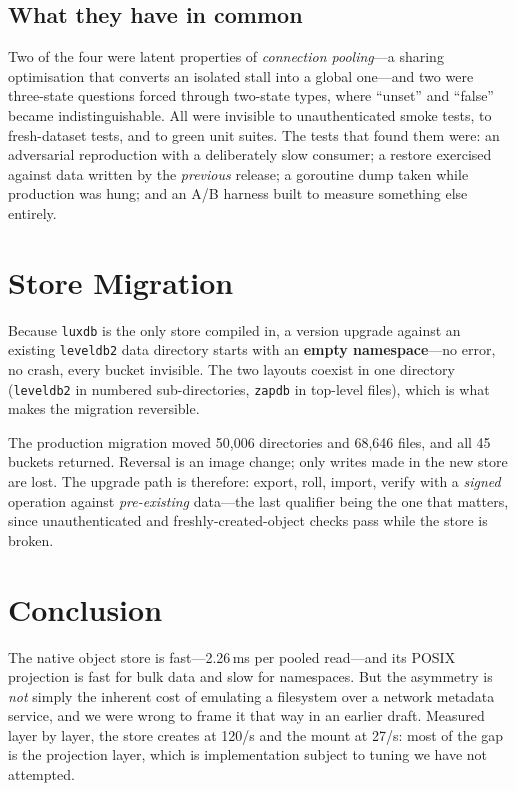 \documentclass[11pt]{article}
\begin{document}
\subsection{What they have in common}
\label{sec:defects-common}

Two of the four were latent properties of \emph{connection pooling}---a
sharing optimisation that converts an isolated stall into a global one---and
two were three-state questions forced through two-state types, where
``unset'' and ``false'' became indistinguishable. All were invisible to
unauthenticated smoke tests, to fresh-dataset tests, and to green unit suites.
The tests that found them were: an adversarial reproduction with a
deliberately slow consumer; a restore exercised against data written by the
\emph{previous} release; a goroutine dump taken while production was hung; and
an A/B harness built to measure something else entirely.

\section{Store Migration}
\label{sec:migration}

Because \texttt{luxdb} is the only store compiled in, a version upgrade
against an existing \texttt{leveldb2} data directory starts with an
\textbf{empty namespace}---no error, no crash, every bucket invisible. The
two layouts coexist in one directory (\texttt{leveldb2} in numbered
sub-directories, \texttt{zapdb} in top-level files), which is what makes the
migration reversible.

The production migration moved 50{,}006 directories and 68{,}646 files, and
all 45 buckets returned. Reversal is an image change; only writes made in the
new store are lost. The upgrade path is therefore: export, roll, import,
verify with a \emph{signed} operation against \emph{pre-existing} data---the
last qualifier being the one that matters, since unauthenticated and
freshly-created-object checks pass while the store is broken.

\section{Conclusion}

The native object store is fast---2.26\,ms per pooled read---and its POSIX
projection is fast for bulk data and slow for namespaces. But the asymmetry is
\emph{not} simply the inherent cost of emulating a filesystem over a network
metadata service, and we were wrong to frame it that way in an earlier draft.
Measured layer by layer, the store creates at 120/s and the mount at 27/s: most
of the gap is the projection layer, which is implementation subject to tuning
we have not attempted.
\end{document}
